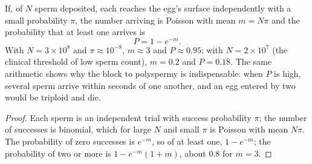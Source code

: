 \begin{theorem}\label{thm:b2:mammal-reproduction:poisson}
If, of $N$ sperm deposited, each reaches the egg's surface
independently with a small probability $\pi$, the number arriving
is Poisson with mean $m = N\pi$ and the probability that at least one
arrives is
\[
P = 1 - e^{-m}.
\]
With $N = 3\times 10^{8}$ and $\pi \approx 10^{-8}$, $m \approx 3$
and $P \approx 0.95$; with $N = 2\times 10^{7}$ (the clinical
threshold of low sperm count), $m = 0.2$ and $P = 0.18$. The same
arithmetic shows why the block to polyspermy is indispensable: when
$P$ is high, several sperm arrive within seconds of one another,
and an egg entered by two would be triploid and die.
\end{theorem}
\begin{proof}
Each sperm is an independent trial with success probability $\pi$;
the number of successes is binomial, which for large $N$ and small
$\pi$ is Poisson with mean $N\pi$. The probability of zero
successes is $e^{-m}$, so of at least one, $1 - e^{-m}$; the
probability of two or more is $1 - e^{-m}(1 + m)$, about $0.8$ for
$m = 3$.
\end{proof}

